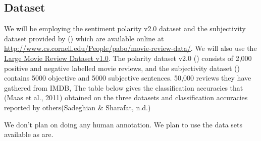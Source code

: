 \documentclass[11pt, oneside]{article}   	%
\begin{document}
\subsection*{Dataset}
We will be employing the sentiment polarity v2.0 dataset and the subjectivity dataset provided by (\cite{pang2004sentimental}) which are available online at \url{http://www.cs.cornell.edu/People/pabo/movie-review-data/}. We will also use the \href{http://ai.stanford.edu/~amaas/data/sentiment/}{Large Movie Review Dataset v1.0}. The polarity dataset v2.0 (\cite{pang2004sentimental}) consists of 2,000 positive and negative labelled movie reviews, and the subjectivity dataset (\cite{pang2004sentimental}) contains 5000 objective and 5000 subjective sentences. 50,000 reviews they have gathered from IMDB, The table below gives the classification accuracies that (Maas et al., 2011) obtained on the three datasets and classification accuracies reported by others(Sadeghian & Sharafat, n.d.)

We don't plan on doing any human annotation. We plan to use the data sets available as are.



\end{document}
